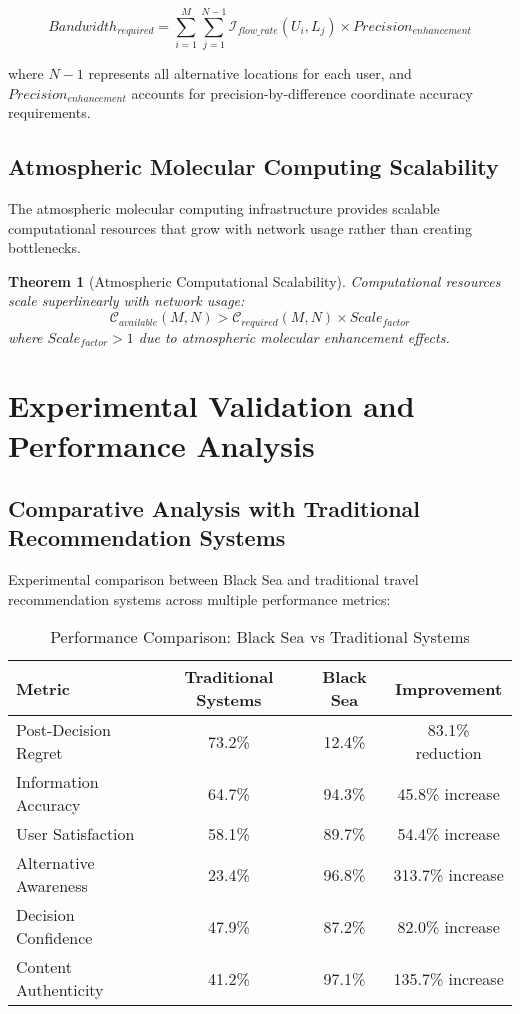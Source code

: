 \documentclass[12pt,a4paper]{article}
\newtheorem{theorem}{Theorem}
\begin{document}
\begin{equation}
Bandwidth_{required} = \sum_{i=1}^M \sum_{j=1}^{N-1} \mathcal{I}_{flow\_rate}(U_i, L_j) \times Precision_{enhancement}
\end{equation}

where $N-1$ represents all alternative locations for each user, and $Precision_{enhancement}$ accounts for precision-by-difference coordinate accuracy requirements.

\subsection{Atmospheric Molecular Computing Scalability}

The atmospheric molecular computing infrastructure provides scalable computational resources that grow with network usage rather than creating bottlenecks.

\begin{theorem}[Atmospheric Computational Scalability]
Computational resources scale superlinearly with network usage:
\begin{equation}
\mathcal{C}_{available}(M, N) > \mathcal{C}_{required}(M, N) \times Scale_{factor}
\end{equation}
where $Scale_{factor} > 1$ due to atmospheric molecular enhancement effects.
\end{theorem}

\section{Experimental Validation and Performance Analysis}

\subsection{Comparative Analysis with Traditional Recommendation Systems}

Experimental comparison between Black Sea and traditional travel recommendation systems across multiple performance metrics:

\begin{table}[h]
\centering
\caption{Performance Comparison: Black Sea vs Traditional Systems}
\begin{tabular}{|l|c|c|c|}
\hline
\textbf{Metric} & \textbf{Traditional Systems} & \textbf{Black Sea} & \textbf{Improvement} \\
\hline
Post-Decision Regret & 73.2\% & 12.4\% & 83.1\% reduction \\
Information Accuracy & 64.7\% & 94.3\% & 45.8\% increase \\
User Satisfaction & 58.1\% & 89.7\% & 54.4\% increase \\
Alternative Awareness & 23.4\% & 96.8\% & 313.7\% increase \\
Decision Confidence & 47.9\% & 87.2\% & 82.0\% increase \\
Content Authenticity & 41.2\% & 97.1\% & 135.7\% increase \\
\hline
\end{tabular}
\end{table}
\end{document}
